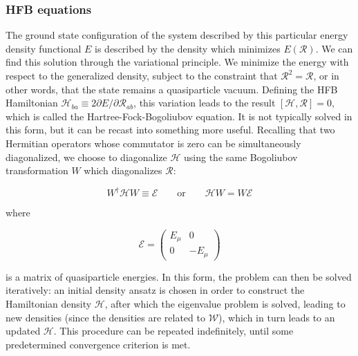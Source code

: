 
\subsubsection{HFB equations}

The ground state configuration of the system described by this particular energy density functional $E$ is described by the density which minimizes $E(\mathcal{R})$. We can find this solution through the variational principle. We minimize the energy with respect to the generalized density, subject to the constraint that $\mathcal{R}^2=\mathcal{R}$, or in other words, that the state remains a quasiparticle vacuum. Defining the HFB Hamiltonian $\mathcal{H}_{ba} \equiv 2 \partial E/\partial \mathcal{R}_{ab}$, this variation leads to the result $\left[\mathcal{H},\mathcal{R}\right]=0$, which is called the Hartree-Fock-Bogoliubov equation. It is not typically solved in this form, but it can be recast into something more useful. Recalling that two Hermitian operators whose commutator is zero can be simultaneously diagonalized, we choose to diagonalize $\mathcal{H}$ using the same Bogoliubov transformation $W$ which diagonalizes $\mathcal{R}$:

\begin{equation}
W^\dagger \mathcal{H} W \equiv \mathcal{E} \qquad\mathrm{or}\qquad \mathcal{H}W = W\mathcal{E}
\end{equation}

\noindent where

\begin{equation}
\mathcal{E} = \left(\begin{array}{cc}
E_\mu & 0 \\
0 & -E_\mu
\end{array}\right)
\end{equation}

\noindent is a matrix of quasiparticle energies. In this form, the problem can then be solved iteratively: an initial density ansatz is chosen in order to construct the Hamiltonian density $\mathcal{H}$, after which the eigenvalue problem is solved, leading to new densities (since the densities are related to $\mathcal{W}$), which in turn leads to an updated $\mathcal{H}$. This procedure can be repeated indefinitely, until some predetermined convergence criterion is met.


